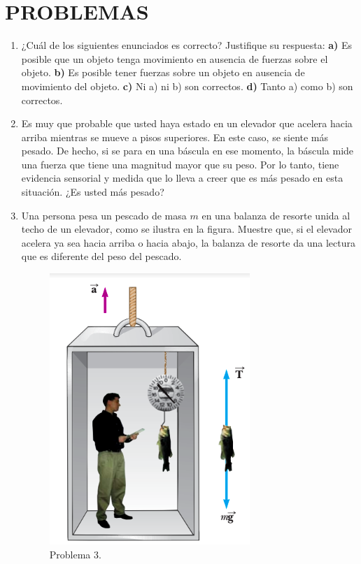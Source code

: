 \documentclass{article}
\begin{document}
\section*{PROBLEMAS}
\begin{enumerate}
\item ¿Cuál de los siguientes enunciados es correcto? Justifique su respuesta: \textbf{a)} Es posible que un objeto tenga movimiento en ausencia de fuerzas sobre el objeto. \textbf{b)} Es posible tener fuerzas sobre un objeto en ausencia de movimiento del objeto. \textbf{c)} Ni a) ni b) son correctos. \textbf{d)} Tanto a) como b) son correctos.

\item Es muy que probable que usted haya estado en un elevador que acelera hacia arriba mientras se mueve a pisos superiores. En este caso, se siente más pesado. De hecho, si se para en una báscula en ese momento, la báscula mide una fuerza que tiene una magnitud mayor que su peso. Por lo tanto, tiene evidencia sensorial y medida que lo lleva a creer que es más pesado en esta situación. ¿Es usted más pesado?

\item Una persona pesa un pescado de masa $m$ en una balanza de resorte unida al techo de un elevador, como se ilustra en la figura. Muestre que, si el elevador acelera ya sea hacia arriba o hacia abajo, la balanza de resorte da una lectura que es diferente del peso del pescado.

\begin{figure}[H]
\centering
\includegraphics[scale=0.4]{problema_3.png}
\caption{Problema 3.}
\end{figure}


\end{enumerate}
\end{document}

